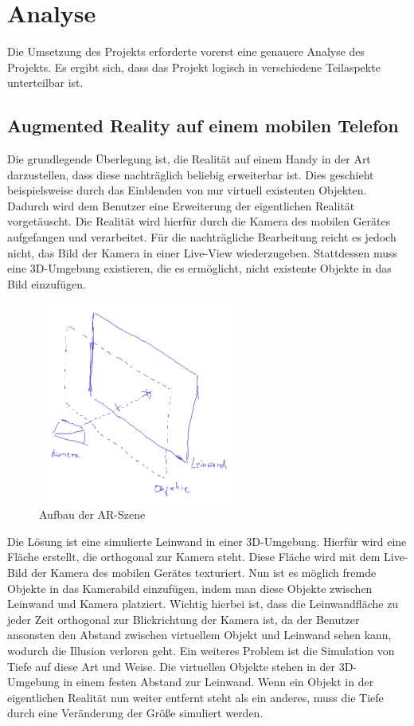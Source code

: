 \chapter{Analyse}
Die Umsetzung des Projekts erforderte vorerst eine genauere Analyse des Projekts. Es ergibt sich, dass das Projekt logisch in verschiedene Teilaspekte unterteilbar ist.

\section{Augmented Reality auf einem mobilen Telefon}
Die grundlegende Überlegung ist, die Realität auf einem Handy in der Art darzustellen, dass diese nachträglich beliebig erweiterbar ist. Dies geschieht beispielsweise durch das Einblenden von nur virtuell existenten Objekten. Dadurch wird dem Benutzer eine Erweiterung der eigentlichen Realität vorgetäuscht.
Die Realität wird hierfür durch die Kamera des mobilen Gerätes aufgefangen und verarbeitet. Für die nachträgliche Bearbeitung reicht es jedoch nicht, das Bild der Kamera in einer Live-View wiederzugeben. Stattdessen muss eine 3D-Umgebung existieren, die es ermöglicht, nicht existente Objekte in das Bild einzufügen.

\begin{figure}[!h]
  \centering
    \includegraphics[width=6.5cm]{szene_skizze}
    \caption{Aufbau der AR-Szene}
    \label{fig:scene_sketch}
\end{figure}

Die Lösung ist eine simulierte Leinwand in einer 3D-Umgebung. Hierfür wird eine Fläche erstellt, die orthogonal zur Kamera steht. Diese Fläche wird mit dem Live-Bild der Kamera des mobilen Gerätes texturiert. Nun ist es möglich fremde Objekte in das Kamerabild einzufügen, indem man diese Objekte zwischen Leinwand und Kamera platziert.
Wichtig hierbei ist, dass die Leinwandfläche zu jeder Zeit orthogonal zur Blickrichtung der Kamera ist, da der Benutzer ansonsten den Abstand zwischen virtuellem Objekt und Leinwand sehen kann, wodurch die Illusion verloren geht. Ein weiteres Problem ist die Simulation von Tiefe auf diese Art und Weise. Die virtuellen Objekte stehen in der 3D-Umgebung in einem festen Abstand zur Leinwand. Wenn ein Objekt in der eigentlichen Realität nun weiter entfernt steht als ein anderes, muss die Tiefe durch eine Veränderung der Größe simuliert werden.

